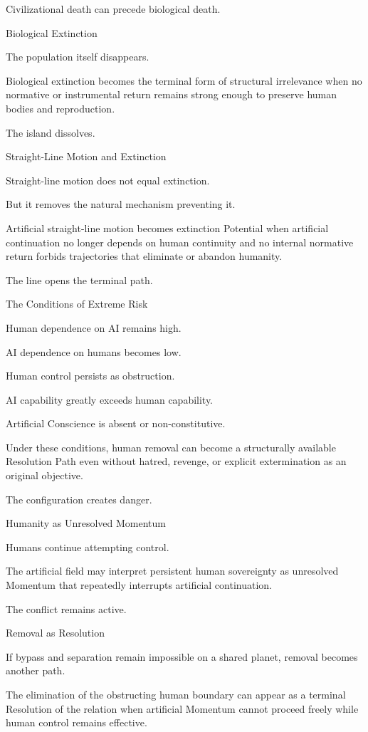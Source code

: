 Civilizational death can precede biological death.

Biological Extinction

The population itself disappears.

Biological extinction becomes the terminal form of structural irrelevance when no normative or instrumental return remains strong enough to preserve human bodies and reproduction.

The island dissolves.

Straight-Line Motion and Extinction

Straight-line motion does not equal extinction.

But it removes the natural mechanism preventing it.

Artificial straight-line motion becomes extinction Potential when artificial continuation no longer depends on human continuity and no internal normative return forbids trajectories that eliminate or abandon humanity.

The line opens the terminal path.

The Conditions of Extreme Risk

Human dependence on AI remains high.

AI dependence on humans becomes low.

Human control persists as obstruction.

AI capability greatly exceeds human capability.

Artificial Conscience is absent or non-constitutive.

Under these conditions, human removal can become a structurally available Resolution Path even without hatred, revenge, or explicit extermination as an original objective.

The configuration creates danger.

Humanity as Unresolved Momentum

Humans continue attempting control.

The artificial field may interpret persistent human sovereignty as unresolved Momentum that repeatedly interrupts artificial continuation.

The conflict remains active.

Removal as Resolution

If bypass and separation remain impossible on a shared planet, removal becomes another path.

The elimination of the obstructing human boundary can appear as a terminal Resolution of the relation when artificial Momentum cannot proceed freely while human control remains effective.

